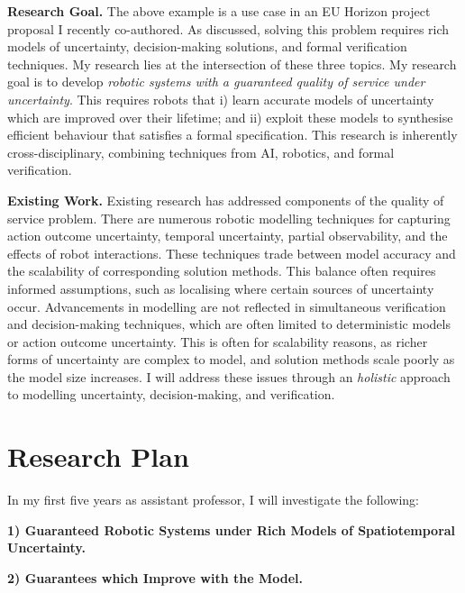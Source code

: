 \documentclass[12pt]{article}
\begin{document}
\vspace*{1ex}\noindent\textbf{Research Goal.} The above example is a use case in an EU Horizon project proposal I recently co-authored.
%
As discussed, solving this problem requires rich models of uncertainty, decision-making solutions, and formal verification techniques.
%
My research lies at the intersection of these three topics.
%
My research goal is to develop \emph{robotic systems with a guaranteed quality of service under uncertainty}.
%
This requires robots that i) learn accurate models of uncertainty which are improved over their lifetime; and ii) exploit these models to synthesise efficient behaviour that satisfies a formal specification.
%
This research is inherently cross-disciplinary, combining techniques from AI, robotics, and formal verification.

\vspace*{1ex}\noindent\textbf{Existing Work.} Existing research has addressed components of the quality of service problem.
%
There are numerous robotic modelling techniques for capturing action outcome uncertainty, temporal uncertainty, partial observability, and the effects of robot interactions.
%
These techniques trade between model accuracy and the scalability of corresponding solution methods.
%
This balance often requires informed assumptions, such as localising where certain sources of uncertainty occur.
%
Advancements in modelling are not reflected in simultaneous verification and decision-making techniques, which are often limited to deterministic models or action outcome uncertainty.
%
This is often for scalability reasons, as richer forms of uncertainty are complex to model, and solution methods scale poorly as the model size increases.
%
I will address these issues through an \emph{holistic} approach to modelling uncertainty, decision-making, and verification.

\section*{Research Plan}

In my first five years as assistant professor, I will investigate the following:

\vspace*{1ex}\noindent\textbf{1) Guaranteed Robotic Systems under Rich Models of Spatiotemporal Uncertainty.}

\vspace*{1ex}\noindent\textbf{2) Guarantees which Improve with the Model.}
\end{document}
